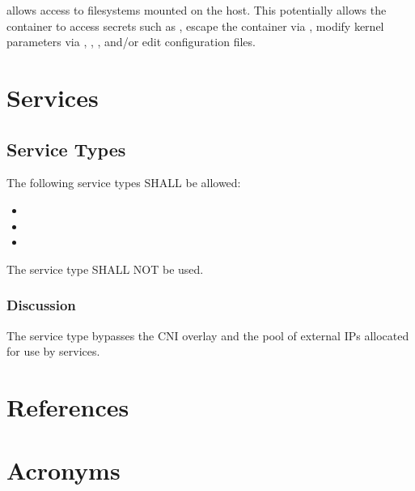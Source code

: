 \documentclass[PMO,authoryear,toc]{lsstdoc}
\begin{document}
 allows access to filesystems mounted on the host. This potentially allows the container to access secrets such as , escape the container via , modify kernel parameters via , , , and/or edit configuration files.

\section{Services}\label{sec:svc}

\subsection{Service Types}

The following service types SHALL be allowed:

\begin{itemize}
  \item {}
  \item {}
  \item {}
\end{itemize}

The  service type SHALL NOT be used.

\subsubsection{Discussion}

The  service type bypasses the CNI overlay and the pool of external IPs allocated for use by  services.

\appendix
\section{References} \label{sec:bib}
\renewcommand{\refname}{} %


\section{Acronyms} \label{sec:acronyms}

\end{document}

